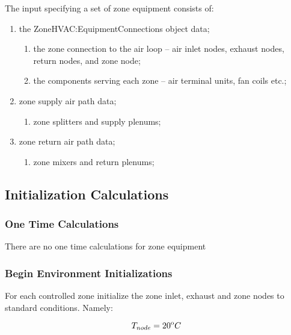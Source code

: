 The input specifying a set of zone equipment consists of:

\begin{enumerate}
\def\labelenumi{\arabic{enumi}.}
\def\labelenumii{\alph{enumii}.}
\def\labelenumiii{\roman{enumiii}.}
  \item
    the ZoneHVAC:EquipmentConnections object data;
    \begin{enumerate}
      \item the zone connection to the air loop – air inlet nodes, exhaust nodes, return nodes, and zone node;
      \item the components serving each zone – air terminal units, fan coils etc.;
    \end{enumerate}
  \item
    zone supply air path data;
    \begin{enumerate}
      \item zone splitters and supply plenums;
    \end{enumerate}
  \item
    zone return air path data;
    \begin{enumerate}
      \item zone mixers and return plenums;
    \end{enumerate}
\end{enumerate}

\subsection{Initialization Calculations}\label{initialization-calculations-000}

\subsubsection{One Time Calculations}\label{one-time-calculations-000}

There are no one time calculations for zone equipment

\subsubsection{Begin Environment Initializations}\label{begin-environment-initializations-000}

For each controlled zone initialize the zone inlet, exhaust and zone nodes to standard conditions. Namely:

\begin{equation}
{T_{node}} = {20^{\rm{o}}}C
\end{equation}

